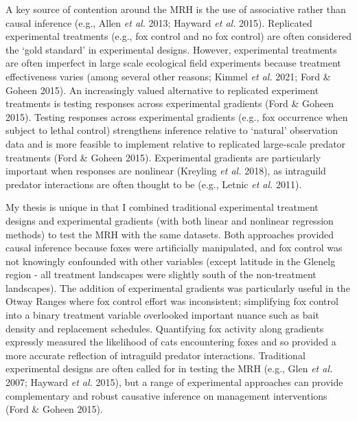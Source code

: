 \documentclass[11pt,a4paper,titlepage,twoside,openright]{style/unimelbthesis}
\begin{document}
\begin{mainmatter}
A key source of contention around the MRH is the use of associative rather than causal inference (e.g., Allen \emph{et al.} 2013; Hayward \emph{et al.} 2015). Replicated experimental treatments (e.g., fox control and no fox control) are often considered the `gold standard' in experimental designs. However, experimental treatments are often imperfect in large scale ecological field experiments because treatment effectiveness varies (among several other reasons; Kimmel \emph{et al.} 2021; Ford \& Goheen 2015). An increasingly valued alternative to replicated experiment treatments is testing responses across experimental gradients (Ford \& Goheen 2015). Testing responses across experimental gradients (e.g., fox occurrence when subject to lethal control) strengthens inference relative to `natural' observation data and is more feasible to implement relative to replicated large-scale predator treatments (Ford \& Goheen 2015). Experimental gradients are particularly important when responses are nonlinear (Kreyling \emph{et al.} 2018), as intraguild predator interactions are often thought to be (e.g., Letnic \emph{et al.} 2011).

My thesis is unique in that I combined traditional experimental treatment designs and experimental gradients (with both linear and nonlinear regression methods) to test the MRH with the same datasets. Both approaches provided causal inference because foxes were artificially manipulated, and fox control was not knowingly confounded with other variables (except latitude in the Glenelg region - all treatment landscapes were slightly south of the non-treatment landscapes). The addition of experimental gradients was particularly useful in the Otway Ranges where fox control effort was inconsistent; simplifying fox control into a binary treatment variable overlooked important nuance such as bait density and replacement schedules. Quantifying fox activity along gradients expressly measured the likelihood of cats encountering foxes and so provided a more accurate reflection of intraguild predator interactions. Traditional experimental designs are often called for in testing the MRH (e.g., Glen \emph{et al.} 2007; Hayward \emph{et al.} 2015), but a range of experimental approaches can provide complementary and robust causative inference on management interventions (Ford \& Goheen 2015).


\end{mainmatter}
\end{document}
